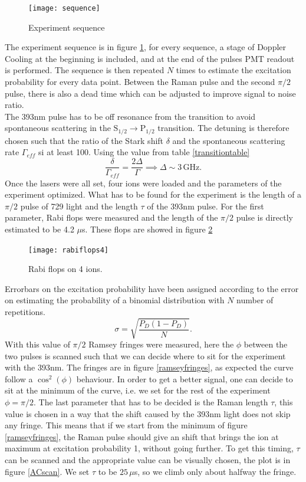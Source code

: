 \begin{figure}
\centering
\texttt{[image: sequence]}
\caption{Experiment sequence}
\label{sequence}
\end{figure}
The experiment sequence is in figure \ref{sequence}, for every sequence, a stage of Doppler Cooling at the beginning is included, and at the end of the pulses PMT readout is performed. The sequence is then repeated $N$ times to estimate the excitation probability for every data point. Between the Raman pulse and the second $\pi/2$ pulse, there is also a dead time which can be adjusted to improve signal to noise ratio.\\
The 393nm pulse has to be off resonance from the transition to avoid spontaneous scattering in the $\text{S}_{1/2}\to \text{P}_{1/2}$ transition. The detuning is therefore chosen such that the ratio of the Stark shift $\delta$ and the spontaneous scattering rate $\Gamma_{eff}$ si at least 100. Using the value from table \ref{transitiontable}
\begin{equation}
\frac{\delta}{\Gamma_{eff}} = \frac{2\Delta}{\Gamma} \implies \Delta \sim 3\,\text{GHz}.
\end{equation}
Once the lasers were all set, four ions were loaded and the parameters of the experiment optimized. What has to be found for the experiment is the length of a $\pi/2$ pulse of 729 light and the length $\tau$ of the 393nm pulse. For the first parameter, Rabi flops were measured and the length of the $\pi/2$ pulse is directly estimated to be 4.2 $\mu$s. These flops are showed in figure \ref{rabiflops4}
\begin{figure}[H]
\centering
\texttt{[image: rabiflops4]}
\caption{Rabi flops on 4 ions.}
\label{rabiflops4}
\end{figure}
Errorbars on the excitation probability have been assigned according to the error on estimating the probability of a binomial distribution with $N$ number of repetitions.
\begin{equation}
\sigma = \sqrt{\frac{P_{D}(1-P_{D})}{N}}.
\end{equation}
With this value of $\pi/2$ Ramsey fringes were measured, here the $\phi$ between the two pulses is scanned such that we can decide where to sit for the experiment with the 393nm.
The fringes are in figure \ref{ramseyfringes}, as expected the curve follow a $\cos^2(\phi)$ behaviour. In order to get a better signal, one can decide to sit at the minimum of the curve, i.e. we set for the rest of the experiment $\phi = \pi/2$. The last parameter that has to be decided is the Raman length $\tau$, this value is chosen in a way that the shift caused by the 393nm light does not skip any fringe. This means that if we start from the minimum of figure \ref{ramseyfringes}, the Raman pulse should give an shift that brings the ion at maximum at excitation probability 1, without going further. To get this timing, $\tau$ can be scanned and the appropriate value can be visually chosen, the plot is in figure \ref{ACscan}. We set $\tau$ to be $25\,\mu$s, so we climb only about halfway the fringe.
